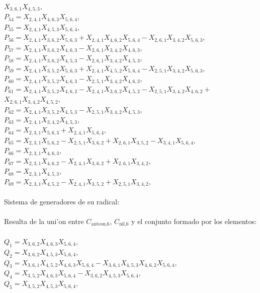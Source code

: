 \documentclass[10pt]{beamer}
\begin{document}
{$X_{3,6,1}X_{4,5,3},$\\
$P_{54}=X_{2,4,1}X_{4,6,3}X_{5,6,4},$\\
$P_{55}=X_{2,4,1}X_{4,5,3}X_{5,6,4},$\\
$P_{56}=X_{2,4,1}X_{3,6,2}X_{5,6,3}+X_{2,4,1}X_{4,6,2}X_{5,6,4}-X_{2,6,1}X_{3,4,2}X_{5,6,3},$\\
$P_{57}=X_{2,4,1}X_{3,6,2}X_{4,6,3}-X_{2,6,1}X_{3,4,2}X_{4,6,3},$\\
$P_{58}=X_{2,4,1}X_{3,6,2}X_{4,5,3}-X_{2,6,1}X_{3,4,2}X_{4,5,3},$\\
$P_{59}=X_{2,4,1}X_{3,5,2}X_{5,6,3}+X_{2,4,1}X_{4,5,2}X_{5,6,4}-X_{2,5,1}X_{3,4,2}X_{5,6,3},$\\
$P_{60}=X_{2,4,1}X_{3,5,2}X_{4,6,3}-X_{2,5,1}X_{3,4,2}X_{4,6,3},$\\
$P_{61}=X_{2,4,1}X_{3,5,2}X_{4,6,2}-X_{2,4,1}X_{3,6,2}X_{4,5,2}-X_{2,5,1}X_{3,4,2}X_{4,6,2}+$\\
$X_{2,6,1}X_{3,4,2}X_{4,5,2},$\\
$P_{62}=X_{2,4,1}X_{3,5,2}X_{4,5,3}-X_{2,5,1}X_{3,4,2}X_{4,5,3},$\\
$P_{63}=X_{2,4,1}X_{3,4,2}X_{4,5,3},$\\
$P_{64}=X_{2,3,1}X_{5,6,3}+X_{2,4,1}X_{5,6,4},$\\
$P_{65}=X_{2,3,1}X_{5,6,2}-X_{2,5,1}X_{3,6,2}+X_{2,6,1}X_{3,5,2}-X_{3,4,1}X_{5,6,4},$\\
$P_{66}=X_{2,3,1}X_{4,6,3},$\\
$P_{67}=X_{2,3,1}X_{4,6,2}-X_{2,4,1}X_{3,6,2}+X_{2,6,1}X_{3,4,2},$\\
$P_{68}=X_{2,3,1}X_{4,5,3},$\\
$P_{69}=X_{2,3,1}X_{4,5,2}-X_{2,4,1}X_{3,5,2}+X_{2,5,1}X_{3,4,2},$\\
\\
Sistema de generadores de su radical:\\
\\
Resulta de la uni'on entre $C_{\text{antcon,}6}$, $C_{\text{nil,}6}$ y el conjunto formado por los elementos:\\
\\ 
$Q_{1}=X_{3,6,2}X_{4,6,3}X_{5,6,4},$\\
$Q_{2}=X_{3,6,2}X_{4,5,3}X_{5,6,4},$\\
$Q_{3}=X_{3,6,1}X_{4,5,2}X_{4,6,3}X_{5,6,4}-X_{3,6,1}X_{4,5,3}X_{4,6,2}X_{5,6,4},$\\
$Q_{4}=X_{3,5,2}X_{4,6,3}X_{5,6,4}-X_{3,6,2}X_{4,5,3}X_{5,6,4},$\\
$Q_{5}=X_{3,5,2}X_{4,5,3}X_{5,6,4},$\\
}
\end{document}
